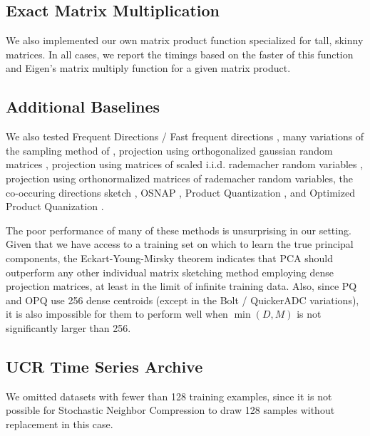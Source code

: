 \subsection{Exact Matrix Multiplication}

We also implemented our own matrix product function specialized for tall, skinny matrices. In all cases, we report the timings based on the faster of this function and Eigen's \cite{eigen} matrix multiply function for a given matrix product.

\subsection{Additional Baselines}

We also tested Frequent Directions / Fast frequent directions \cite{liberty_simple_2012, ghashami_frequent_2016, isvd}, many variations of the sampling method of \cite{drineas_fast_2006}, projection using orthogonalized gaussian random matrices \cite{superbitLSH}, projection using matrices of scaled i.i.d. rademacher random variables \cite{rademacherJL}, projection using orthonormalized matrices of rademacher random variables, the co-occuring directions sketch \cite{mroueh_co-occuring_2016}, OSNAP \cite{osnap}, Product Quantization \cite{pq}, and Optimized Product Quanization \cite{opq}.

The poor performance of many of these methods is unsurprising in our setting. Given that we have access to a training set on which to learn the true principal components, the Eckart-Young-Mirsky theorem \cite{eckartYoungMirskyThm} indicates that PCA should outperform any other individual matrix sketching method employing dense projection matrices, at least in the limit of infinite training data. Also, since PQ and OPQ use 256 dense centroids (except in the Bolt / QuickerADC variations), it is also impossible for them to perform well when $\min(D, M)$ is not significantly larger than 256.

\subsection{UCR Time Series Archive}

We omitted datasets with fewer than 128 training examples, since it is not possible for Stochastic Neighbor Compression to draw 128 samples without replacement in this case.

